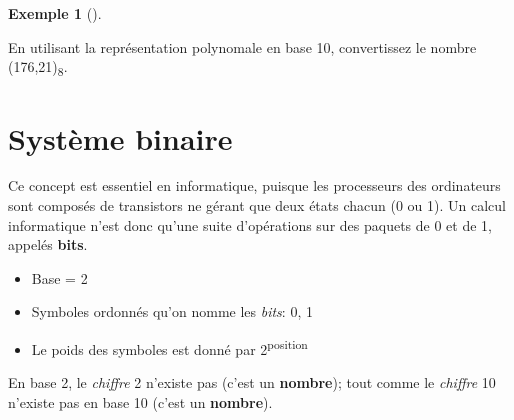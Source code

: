 \documentclass[
  letterpaper,
]{scrbook}
\providecommand{\tightlist}{%
  \setlength{\itemsep}{0pt}\setlength{\parskip}{0pt}}\usepackage{longtable,booktabs,array}
\theoremstyle{plain}
\theoremstyle{definition}
\newtheorem{example}{Exemple}[chapter]
\theoremstyle{definition}
\theoremstyle{remark}
\begin{document}
\leavevmode{}%
\begin{example}[]\label{exm-octal-vers-decimal}

En utilisant la représentation polynomale en base 10, convertissez le
nombre (176,21)\textsubscript{8}.

\end{example}

\hypertarget{systuxe8me-binaire}{%
\section{Système binaire}\label{systuxe8me-binaire}}

Ce concept est essentiel en informatique, puisque les processeurs des
ordinateurs sont composés de transistors ne gérant que deux états chacun
(0 ou 1). Un calcul informatique n'est donc qu'une suite d'opérations
sur des paquets de 0 et de 1, appelés \textbf{bits}.

\begin{itemize}
\tightlist
\item
  Base = 2
\item
  Symboles ordonnés qu'on nomme les \emph{bits}: 0, 1
\item
  Le poids des symboles est donné par 2\textsuperscript{position}
\end{itemize}

\begin{tcolorbox}[enhanced jigsaw, opacityback=0, rightrule=.15mm, breakable, toprule=.15mm, colbacktitle=quarto-callout-important-color!10!white, title=\textcolor{quarto-callout-important-color}{\faExclamation}\hspace{0.5em}{Important}, titlerule=0mm, arc=.35mm, colback=white, coltitle=black, colframe=quarto-callout-important-color-frame, bottomtitle=1mm, toptitle=1mm, bottomrule=.15mm, leftrule=.75mm, left=2mm, opacitybacktitle=0.6]

En base 2, le \emph{chiffre} 2 n'existe pas (c'est un \textbf{nombre});
tout comme le \emph{chiffre} 10 n'existe pas en base 10 (c'est un
\textbf{nombre}).

\end{tcolorbox}
\end{document}

